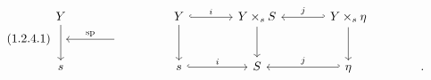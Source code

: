\begin{equation}\tag{1.2.4.1}
\begin{tikzcd}[column sep=large, row sep=small]
Y \arrow[dd] & {} & Y \arrow[r, hook, "i"] \arrow[dd] & Y \times_s S \arrow[dd] & Y \times_s \eta \arrow[l, hook', "j"'] \arrow[dd] & \\
{} & {} \arrow[l, "\mathrm{sp}"'] & & & & \\
s & {} & s \arrow[r, hook, "i"] & S & \eta \arrow[l, hook', "j"'] & {.}
\end{tikzcd}
\end{equation}
